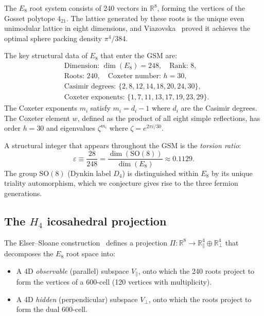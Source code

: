 \documentclass[aps,prd,twocolumn,superscriptaddress,nofootinbib,showpacs]{revtex4-2}
\begin{document}
The $E_8$ root system consists of 240 vectors in $\mathbb{R}^8$,
forming the vertices of the Gosset polytope $4_{21}$.  The lattice
generated by these roots is the unique even unimodular lattice in eight
dimensions, and Viazovska~\cite{Viazovska2016} proved it achieves the
optimal sphere packing density $\pi^4/384$.

The key structural data of $E_8$ that enter the GSM are:
\begin{align}
&\text{Dimension: } \dim(E_8) = 248, \quad \text{Rank: } 8, \nonumber \\
&\text{Roots: } 240, \quad \text{Coxeter number: } h = 30, \nonumber \\
&\text{Casimir degrees: } \{2,8,12,14,18,20,24,30\}, \label{eq:e8data} \\
&\text{Coxeter exponents: } \{1,7,11,13,17,19,23,29\}. \nonumber
\end{align}
The Coxeter exponents $m_i$ satisfy $m_i = d_i - 1$ where $d_i$ are
the Casimir degrees.  The Coxeter element $w$, defined as the product
of all eight simple reflections, has order $h = 30$ and eigenvalues
$\zeta^{m_i}$ where $\zeta = e^{2\pi i/30}$.

A structural integer that appears throughout the GSM is the
\emph{torsion ratio}:
\begin{equation}
\varepsilon \equiv \frac{28}{248} = \frac{\dim(\mathrm{SO}(8))}{\dim(E_8)} \approx 0.1129.
\label{eq:torsion}
\end{equation}
The group $\mathrm{SO}(8)$ (Dynkin label $D_4$) is distinguished within
$E_8$ by its unique triality automorphism, which we conjecture gives
rise to the three fermion generations.

\subsection{The $H_4$ icosahedral projection}\label{sec:h4}

The Elser--Sloane construction~\cite{ElserSloane} defines a projection
$\Pi: \mathbb{R}^8 \to \mathbb{R}^4_\parallel \oplus
\mathbb{R}^4_\perp$ that decomposes the $E_8$ root space into:
\begin{itemize}
\item A 4D \emph{observable} (parallel) subspace $V_\parallel$, onto
which the 240 roots project to form the vertices of a 600-cell (120
vertices with multiplicity).
\item A 4D \emph{hidden} (perpendicular) subspace $V_\perp$, onto
which the roots project to form the dual 600-cell.
\end{itemize}
\end{document}
